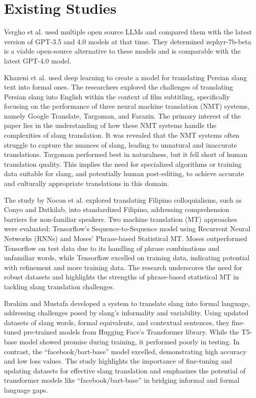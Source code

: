 \section{Existing Studies}
Vergho et al. \cite{Vergho} used multiple open source LLMs and compared them with the latest version of GPT-3.5 and 4.0 models at that time.
They determined zephyr-7b-beta is a viable open-source alternative to these models and is comparable with the latest GPT-4.0 model.

Khazeni et al. \cite{Khazeni} used deep learning to create a model for translating Persian slang text into formal ones. The researchers explored the challenges of translating Persian slang into English within the context of film subtitling, specifically focusing on the performance of three neural machine translation (NMT) systems, namely Google Translate, Targoman, and Farazin. The primary interest of the paper lies in the understanding of how these NMT systems handle the complexities of slang translation. It was revealed that the NMT systems often struggle to capture the nuances of slang, leading to unnatural and inaccurate translations. Targoman performed best in naturalness, but it fell short of human translation quality. This implies the need for specialized algorithms or training data suitable for slang, and potentially human post-editing, to achieve accurate and culturally appropriate translations in this domain.

The study by Nocon et al. \cite{Nocon_Kho_Arroyo_2018} explored translating Filipino colloquialisms, such as Conyo and Datkilab, into standardized Filipino, addressing comprehension barriers for non-familiar speakers. Two machine translation (MT) approaches were evaluated: Tensorflow's Sequence-to-Sequence model using Recurrent Neural Networks (RNNs) and Moses' Phrase-based Statistical MT. Moses outperformed Tensorflow on test data due to its handling of phrase combinations and unfamiliar words, while Tensorflow excelled on training data, indicating potential with refinement and more training data. The research underscores the need for robust datasets and highlights the strengths of phrase-based statistical MT in tackling slang translation challenges.

Ibrahim and Mustafa \cite{Ibrahim_Sharief} developed a system to translate slang into formal language, addressing challenges posed by slang's informality and variability. Using updated datasets of slang words, formal equivalents, and contextual sentences, they fine-tuned pre-trained models from Hugging Face's Transformer library. While the T5-base model showed promise during training, it performed poorly in testing. In contrast, the “facebook/bart-base” model excelled, demonstrating high accuracy and low loss values. The study highlights the importance of fine-tuning and updating datasets for effective slang translation and emphasizes the potential of transformer models like “facebook/bart-base” in bridging informal and formal language gaps. 

